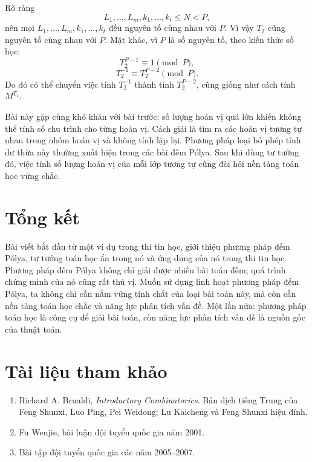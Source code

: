 \documentclass[11pt]{article}
\begin{document}
Rõ ràng
\[
  L_1,\ldots,L_m,k_1,\ldots,k_t\le N<P,
\]
nên mọi \(L_1,\ldots,L_m,k_1,\ldots,k_t\) đều nguyên tố cùng nhau với \(P\).
Vì vậy \(T_2\) cũng nguyên tố cùng nhau với \(P\). Mặt khác, vì \(P\) là số
nguyên tố, theo kiến thức số học:
\[
  T_2^{P-1}\equiv 1\pmod P,
\]
\[
  T_2^{-1}\equiv T_2^{P-2}\pmod P.
\]
Do đó có thể chuyển việc tính \(T_2^{-1}\) thành tính \(T_2^{P-2}\), cũng
giống như cách tính \(M^{T_1}\).

Bài này gặp cùng khó khăn với bài trước: số lượng hoán vị quá lớn khiến không
thể tính số chu trình cho từng hoán vị. Cách giải là tìm ra các hoán vị tương
tự nhau trong nhóm hoán vị và không tính lặp lại. Phương pháp loại bỏ phép
tính dư thừa này thường xuất hiện trong các bài đếm Pólya. Sau khi dùng tư
tưởng đó, việc tính số lượng hoán vị của mỗi lớp tương tự cũng đòi hỏi nền
tảng toán học vững chắc.

\section{Tổng kết}

Bài viết bắt đầu từ một ví dụ trong thi tin học, giới thiệu phương pháp đếm
Pólya, tư tưởng toán học ẩn trong nó và ứng dụng của nó trong thi tin học.
Phương pháp đếm Pólya không chỉ giải được nhiều bài toán đếm; quá trình chứng
minh của nó cũng rất thú vị. Muốn sử dụng linh hoạt phương pháp đếm Pólya, ta
không chỉ cần nắm vững tính chất của loại bài toán này, mà còn cần nền tảng
toán học chắc và năng lực phân tích vấn đề. Một lần nữa: phương pháp toán học
là công cụ để giải bài toán, còn năng lực phân tích vấn đề là nguồn gốc của
thuật toán.

\section*{Tài liệu tham khảo}

\begin{enumerate}
  \item Richard A. Brualdi, \textit{Introductory Combinatorics}. Bản dịch
  tiếng Trung của Feng Shunxi, Luo Ping, Pei Weidong; Lu Kaicheng và Feng
  Shunxi hiệu đính.
  \item Fu Wenjie, bài luận đội tuyển quốc gia năm 2001.
  \item Bài tập đội tuyển quốc gia các năm 2005--2007.
\end{enumerate}
\end{document}
